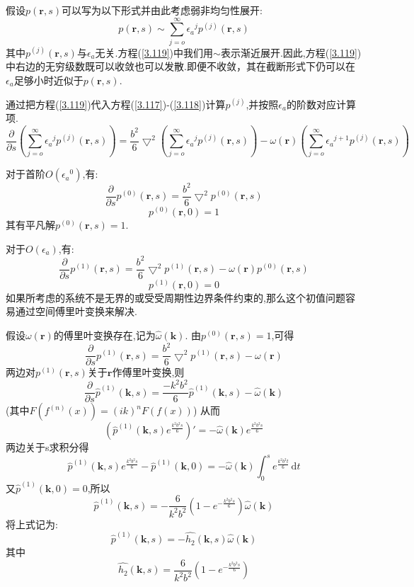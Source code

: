 假设$p(\mathbf{r},s)$可以写为以下形式并由此考虑弱非均匀性展开:
\begin{equation}
p(\mathbf{r},s) \sim \sum_{j=o}^{\infty} {\epsilon_a}^j p^{(j)} (\mathbf{r},s) \label{3.119}
\end{equation}
其中$p^{(j)} (\mathbf{r},s)$与$\epsilon_a$无关.方程(\ref{3.119})中我们用$\sim$表示渐近展开.因此,方程(\ref{3.119})中右边的无穷级数既可以收敛也可以发散.即便不收敛，其在截断形式下仍可以在$\epsilon_a$足够小时近似于$p(\mathbf{r},s)$.

通过把方程(\ref{3.119})代入方程(\ref{3.117})-(\ref{3.118})计算$p^{(j)}$,并按照$\epsilon_a$的阶数对应计算项.
$$\frac{\partial}{\partial s} (\sum_{j=o}^{\infty} {\epsilon_a}^j p^{(j)} (\mathbf{r},s)) = \frac{b^2}{6} \bigtriangledown^2 (\sum_{j=o}^{\infty} {\epsilon_a}^j p^{(j)} (\mathbf{r},s)) - \omega(\mathbf{r}) (\sum_{j=o}^{\infty} {\epsilon_a}^{j+1} p^{(j)} (\mathbf{r},s))$$

对于首阶$O({\epsilon_a}^0)$,有:
\begin{equation}
\frac{\partial}{\partial s} p^{(0)}(\mathbf{r},s) = \frac{b^2}{6} \bigtriangledown^2 p^{(0)}(\mathbf{r},s)
\end{equation}
\begin{equation}
p^{(0)}(\mathbf{r},0) = 1
\end{equation}
其有平凡解$p^{(0)}(\mathbf{r},s) = 1$.

对于$O(\epsilon_a)$,有:
\begin{equation}
\frac{\partial}{\partial s} p^{(1)}(\mathbf{r},s) = \frac{b^2}{6} \bigtriangledown^2 p^{(1)}(\mathbf{r},s)-\omega(\mathbf{r}) p^{(0)}(\mathbf{r},s)
\end{equation}
\begin{equation}
p^{(1)}(\mathbf{r},0) = 0
\end{equation}
如果所考虑的系统不是无界的或受受周期性边界条件约束的,那么这个初值问题容易通过空间傅里叶变换来解决.

假设$\omega(\mathbf{r})$的傅里叶变换存在,记为$\hat{\omega}(\mathbf{k})$.
由$p^{(0)}(\mathbf{r},s) = 1$,可得
$$\frac{\partial}{\partial s} p^{(1)}(\mathbf{r},s) = \frac{b^2}{6} \bigtriangledown^2 p^{(1)}(\mathbf{r},s)-\omega(\mathbf{r})$$
两边对$p^{(1)}(\mathbf{r},s)$关于$\mathbf{r}$作傅里叶变换,则
$$\frac{\partial}{\partial s}\hat{p}^{(1)}(\mathbf{k},s) = \frac{-k^2 b^2}{6} \hat{p}^{(1)}(\mathbf{k},s)-\hat{\omega}(\mathbf{k})$$
(其中$F(f^{(n)}(x)) = (ik)^n F(f(x))$)
从而$$(\hat{p}^{(1)}(\mathbf{k},s)e^{\frac{k^2 b^2 s}{6}})' = -\hat{\omega}(\mathbf{k}) e^{\frac{k^2 b^2 s}{6}}$$
两边关于s求积分得
$$\hat{p}^{(1)}(\mathbf{k},s)e^{\frac{k^2 b^2 s}{6}}-\hat{p}^{(1)}(\mathbf{k},0) = -\hat{\omega}(\mathbf{k}) \int_{0}^{s} e^{\frac{k^2 b^2 t}{6}}\, \mathrm{d}t$$
又$\hat{p}^{(1)} (\mathbf{k},0) = 0$,所以
$$\hat{p}^{(1)}(\mathbf{k},s) = -\frac{6}{k^2 b^2} (1-e^{-\frac{k^2 b^2 s}{6}}) \hat{\omega}(\mathbf{k})$$
将上式记为:
\begin{equation}
\hat{p}^{(1)}(\mathbf{k},s) = -\hat{h_2}(\mathbf{k},s) \hat{\omega}(\mathbf{k})
\end{equation}
其中
\begin{equation}
\hat{h_2}(\mathbf{k},s) = \frac{6}{k^2 b^2} (1-e^{-\frac{k^2 b^2 s}{6}})
\end{equation}

